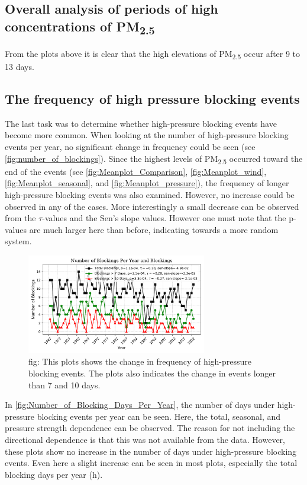\subsection{Overall analysis of periods of high concentrations of \texorpdfstring{PM\textsubscript{2.5}}{PM2.5}}

From the plots above it is clear that the high elevations of PM\textsubscript{2.5} occur after 9 to 13 days. 



\subsection{The frequency of high pressure blocking events}
The last task was to determine whether high-pressure blocking events have become more common. When looking at the number of high-pressure blocking events per year, no significant change in frequency could be seen (see \autoref{fig:number_of_blockings}). Since the highest levels of PM\textsubscript{2.5} occurred toward the end of the events (see \autoref{fig:Meanplot_Comparison}, \autoref{fig:Meanplot_wind}, \autoref{fig:Meanplot_seasonal}, and \autoref{fig:Meanplot_pressure}), the frequency of longer high-pressure blocking events was also examined. However, no increase could be observed in any of the cases. More interestingly a small decrease can be observed from the $\tau$-values and the Sen's slope values. However one must note that the p-values are much larger here than before, indicating towards a more random system. 

\begin{figure}[H]
    \centering
    \includegraphics[width=0.7\textwidth]{Figures/BlockingsPerYear.pdf}
    \caption{fig: This plots shows the change in frequency of high-pressure blocking events. The plots also indicates the change in events longer than 7 and 10 days. }
    \label{fig:number_of_blockings}
\end{figure}

In \autoref{fig:Number_of_Blocking_Days_Per_Year}, the number of days under high-pressure blocking events per year can be seen. Here, the total, seasonal, and pressure strength dependence can be observed. The reason for not including the directional dependence is that this was not available from the data. However, these plots show no increase in the number of days under high-pressure blocking events. Even here a slight increase can be seen in most plots, especially the total blocking days per year (h). 


